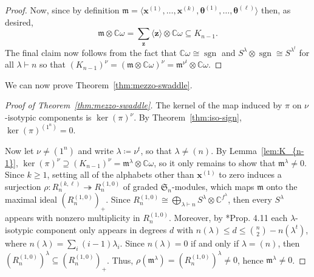 \documentclass[11pt, reqno]{amsart}
\theoremstyle{definition}
\theoremstyle{remark}
\numberwithin{equation}{section}
\newcommand{\0}{\emptyset}
\newcommand{\C}{\mathbb{C}}
\renewcommand{\S}{\mathfrak{S}}
\DeclareMathOperator{\sgn}{sgn}
\begin{document}
\begin{proof}
    Now, since by definition $\mathfrak{m} = \langle \bm{x}^{(1)},\ldots, 
    \bm{x}^{(k)}, \bm{\theta}^{(1)}, \ldots, \bm{\theta}^{(\ell)}\rangle$ then, 
    as desired,
    \[
        \mathfrak{m} \otimes \C\omega = \sum_{\bm{z}} \langle \bm{z} \rangle 
        \otimes \C\omega \subseteq K_{n-1}.
    \]
    The final claim now follows from the fact that $\C\omega \cong \sgn$ and 
    $S^{\lambda} \otimes \sgn \cong S^{\lambda^t}$ for all $\lambda \vdash n$ 
    so that
    $(K_{n-1})^\nu = (\mathfrak{m}\otimes \C\omega)^\nu = \mathfrak{m}^{\nu^t}\otimes \C\omega$.
\end{proof}

We can now prove Theorem~\ref{thm:mezzo-swaddle}.

\begin{proof}[Proof of Theorem~\ref{thm:mezzo-swaddle}]
    The kernel of the map induced by $\pi$ on $\nu$-isotypic components is $\ker(\pi)^\nu$.
    By Theorem~\ref{thm:iso-sign}, $\ker(\pi)^{(1^n)} = 0$.
    
    Now let $\nu \neq (1^n)$ and write $\lambda \coloneqq \nu^t$, so that $\lambda \neq (n)$.
    By Lemma~\ref{lem:K_{n-1}}, 
    $\ker(\pi)^\nu \supseteq (K_{n-1})^\nu = \mathfrak{m}^{\lambda} \otimes \C\omega$, 
    so it only remains to show that $\mathfrak{m}^{\lambda} \neq 0$.
    Since $k \geq 1$, setting all of the alphabets other than $\bm{x}^{(1)}$ 
    to zero induces a surjection $\rho: R_n^{(k,\ell)} \twoheadrightarrow R_n^{(1,0)}$ 
    of graded $\S_n$-modules, which maps $\mathfrak{m}$ onto the 
    maximal ideal $\left(R_n^{(1,0)}\right)_+$.
    Since $R_n^{(1,0)} \cong \bigoplus_{\lambda \vdash n} S^\lambda \otimes \C^{f^\lambda}$, 
    then every $S^\lambda$ appears with nonzero multiplicity in $R_n^{(1,0)}$. 
    Moreover, by \cite{stanley-invariants-finite-groups}*{Prop. 4.11} each 
    $\lambda$-isotypic component only appears in degrees $d$ with 
    $n(\lambda) \leq d \leq \binom{n}{2}-n(\lambda^t)$, where $n(\lambda) = \sum_i (i-1)\lambda_i$. 
    Since $n(\lambda)=0$ if and only if $\lambda = (n)$, 
    then $\left(R_n^{(1,0)}\right)^\lambda \subseteq \left(R_n^{(1,0)}\right)_+$. 
    Thus, $\rho(\mathfrak{m}^\lambda) =  (R_n^{(1,0)})^\lambda \neq 0 $, 
    hence $\mathfrak{m}^\lambda \neq 0$.
\end{proof}
\end{document}
